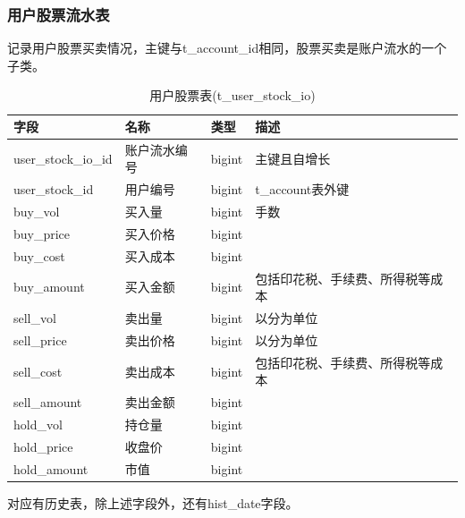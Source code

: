 \documentclass{article}
\begin{document}
\subsubsection{用户股票流水表}
记录用户股票买卖情况，主键与t\_account\_id相同，股票买卖是账户流水的一个子类。
\begin{table}[H]
    \caption{用户股票表(t\_user\_stock\_io)}
    \label{t000006}
    \begin{tabular}{|p{2cm}|p{3cm}|p{2cm}|p{5cm}|} \hline
        字段 & 名称 & 类型 & 描述 \\ \hline 
        user\_stock\_io\_id & 账户流水编号 & bigint & 主键且自增长 \\ \hline
        user\_stock\_id & 用户编号 & bigint & t\_account表外键 \\ \hline
        buy\_vol & 买入量 & bigint & 手数 \\ \hline
        buy\_price & 买入价格 & bigint & \\ \hline
        buy\_cost & 买入成本 & bigint & \\ \hline
        buy\_amount & 买入金额 & bigint & 包括印花税、手续费、所得税等成本 \\ \hline
        sell\_vol & 卖出量 & bigint & 以分为单位 \\ \hline
        sell\_price & 卖出价格 & bigint & 以分为单位  \\ \hline
        sell\_cost & 卖出成本 & bigint & 包括印花税、手续费、所得税等成本 \\ \hline
        sell\_amount & 卖出金额 & bigint & \\ \hline
        hold\_vol & 持仓量 & bigint & \\ \hline
        hold\_price & 收盘价 & bigint & \\ \hline
        hold\_amount & 市值 & bigint & \\ \hline
    \end{tabular}
\end{table}
对应有历史表，除上述字段外，还有hist\_date字段。
\end{document}
